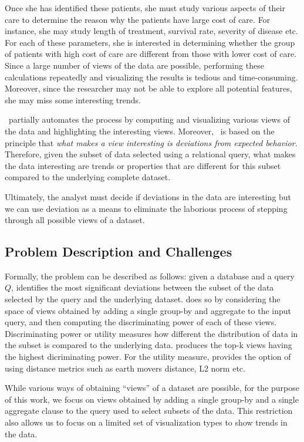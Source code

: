 Once she has identified these patients, she must study various aspects of their
care to determine the reason why the patients have large cost of care. For
instance, she may study length of treatment, survival rate, severity of disease
etc. For each of these parameters, she is interested in determining whether the
group of patients with high cost of care are different from those with lower
cost of care. Since a large number of views of the data are possible, performing
these calculations repeatedly and visualizing the results is tedious and
time-consuming. Moreover, since the researcher may not be able to explore all
potential features, she may miss some interesting trends.

\SeeDB\ partially automates the process by computing and visualizing various
views of the data and highlighting the interesting views. Moreover, \SeeDB\ is
based on the principle that {\it what makes a view interesting is deviations
from expected behavior}. Therefore, given the subset of data selected using a
relational query, what makes the data interesting are trends or properties that
are different for this subset compared to the underlying complete dataset.

Ultimately, the analyst must decide if deviations in the data are interesting
but we can use deviation as a means to eliminate the laborious process
of stepping through all possible views of a dataset. 

\subsection{Problem Description and Challenges}
\label{problem_description}

Formally, the problem can be described as follows: given a database and a query
$Q$, \SeeDB identifies the most significant deviations between the subset of the
data selected by the query and the underlying dataset. \SeeDB does so by
considering the space of views obtained by adding a single group-by and
aggregate to the input query, and then computing the discriminating power of
each of these views. Discriminating power or utility measures how different the
distribution of data in the subset is compared to the underlying data. \SeeDB
produces the top-k views having the highest dicriminating power. For the utility
measure, \SeeDB provides the option of using distance metrics such as earth
movers distance, L2 norm etc.

While various ways of obtaining ``views'' of a dataset are possible, for the
purpose of this work, we focus on views obtained by adding a single group-by and
a single aggregate clause to the query used to select subsets of the data. This
restriction also allows us to focus on a limited set of visualization types to
show trends in the data.

